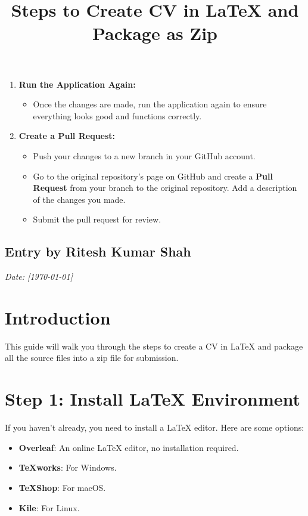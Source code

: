 \documentclass[a4paper,12pt]{article}
\begin{document}
\begin{enumerate}[label=\arabic*.]
    \item \textbf{Run the Application Again:}
    \begin{itemize}
        \item Once the changes are made, run the application again to ensure everything looks good and functions correctly.
    \end{itemize}

    \item \textbf{Create a Pull Request:}
    \begin{itemize}
        \item Push your changes to a new branch in your GitHub account.
        \item Go to the original repository's page on GitHub and create a \textbf{Pull Request} from your branch to the original repository. Add a description of the changes you made.
        \item Submit the pull request for review.
    \end{itemize}

\end{enumerate}

\subsection*{Entry by Ritesh Kumar Shah}
\textit{Date: [\today]}\\


\title{Steps to Create CV in LaTeX and Package as Zip}

\section*{Introduction}
This guide will walk you through the steps to create a CV in LaTeX and package all the source files into a zip file for submission.

\section{Step 1: Install LaTeX Environment}
If you haven't already, you need to install a LaTeX editor. Here are some options:
\begin{itemize}
    \item \textbf{Overleaf}: An online LaTeX editor, no installation required.
    \item \textbf{TeXworks}: For Windows.
    \item \textbf{TeXShop}: For macOS.
    \item \textbf{Kile}: For Linux.
\end{itemize}
\end{document}
